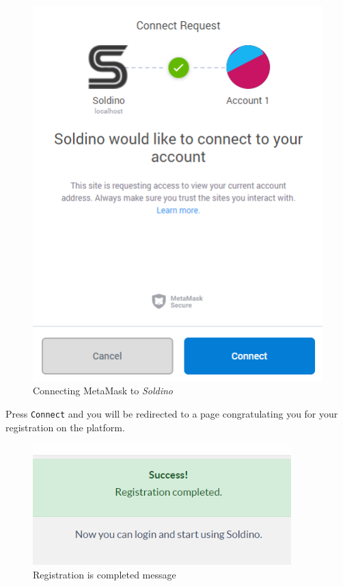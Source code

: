 	\begin{figure}[H]
		\includegraphics[width=12cm]{res/images/metamask_connect.png}
		\centering
		\caption{Connecting MetaMask to \textit{Soldino}}
	\end{figure}
	\noindent \noindent Press \texttt{Connect} and you will be redirected to a page 
	congratulating you for your registration on the platform.
	\begin{figure}[H]
		\includegraphics[width=10cm]{res/images/registration_complete.png}
		\centering
		\caption{Registration is completed message}
	\end{figure}
